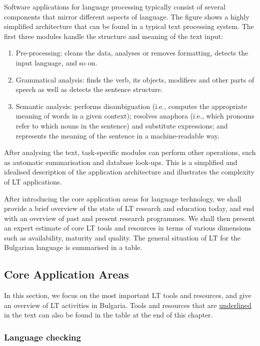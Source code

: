 \begin{multicols}{2}
Software applications for language processing typically consist of several components that mirror different aspects of language. The figure shows a highly simplified architecture that can be found in a typical text processing system. The first three modules handle the structure and meaning of the text input:
\begin{enumerate}
\item Pre-processing: cleans the data, analyses or removes formatting, detects the input language, and so on.
\item Grammatical analysis: finds the verb, its objects, modifiers and other parts of speech as well as detects the sentence structure.
\item Semantic analysis: performs disambiguation (i.e., computes the appropriate meaning of words in a given context); resolves anaphora (i.e., which pronouns refer to which nouns in the sentence) and substitute expressions; and represents the meaning of the sentence in a machine-readable way.
\end{enumerate}

After analysing the text, task-specific modules can perform other operations, such as automatic summarisation and database look-ups. This is a simplified and idealised description of the application architecture and illustrates the complexity of LT applications. 

After introducing the core application areas for language technology, we shall provide a brief overview of the state of LT research and education today, and end with an overview of past and present research programmes. We shall then present an expert estimate of core LT tools and resources in terms of various dimensions such as availability, maturity and quality. The general situation of LT for the Bulgarian language is summarised in a table.


\subsection{Core Application Areas}

In this section, we focus on the most important LT tools and resources, and give an overview of LT activities in Bulgaria. Tools and resources that are \uline{underlined} in the text can also be found in the table at the end of this chapter.  



\subsubsection{Language checking}



\end{multicols}
